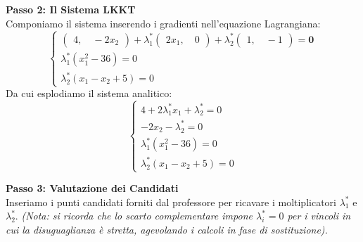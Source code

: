 \documentclass[12pt, a4paper]{article}
\begin{document}
	\textbf{Passo 2: Il Sistema LKKT}\\
	Componiamo il sistema inserendo i gradienti nell'equazione Lagrangiana:
	\[
	\begin{cases}
		\begin{pmatrix} 4, \quad -2x_2 \end{pmatrix} + \lambda^*_1 \begin{pmatrix} 2x_1, \quad 0 \end{pmatrix} + \lambda^*_2 \begin{pmatrix} 1, \quad -1 \end{pmatrix} = \mathbf{0} \\
		\lambda^*_1 (x_1^2 - 36) = 0 \\
		\lambda^*_2 (x_1 - x_2 + 5) = 0
	\end{cases}
	\]
	Da cui esplodiamo il sistema analitico:
	\[
	\begin{cases}
		4 + 2\lambda^*_1 x_1 + \lambda^*_2 = 0 \\
		-2x_2 - \lambda^*_2 = 0 \\
		\lambda^*_1 (x_1^2 - 36) = 0 \\
		\lambda^*_2 (x_1 - x_2 + 5) = 0
	\end{cases}
	\]
	
	\textbf{Passo 3: Valutazione dei Candidati}\\
	Inseriamo i punti candidati forniti dal professore per ricavare i moltiplicatori $\lambda^*_1$ e $\lambda^*_2$. 
	\textit{(Nota: si ricorda che lo scarto complementare impone $\lambda^*_i = 0$ per i vincoli in cui la disuguaglianza è stretta, agevolando i calcoli in fase di sostituzione).}
	
\end{document}
